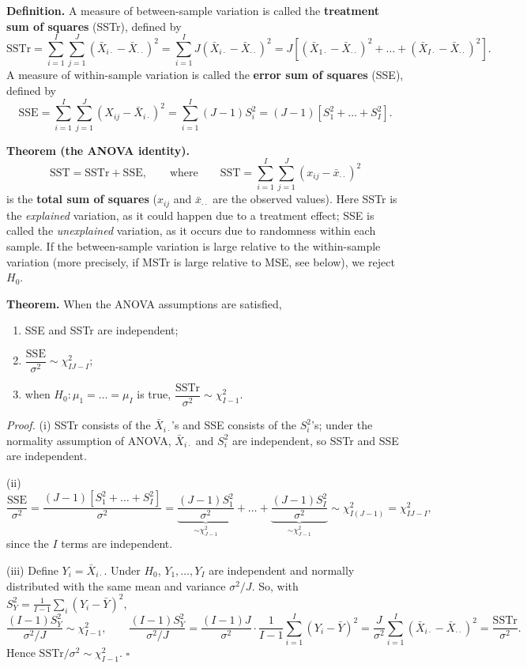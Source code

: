 \textbf{Definition.} A measure of between-sample variation is called the \textbf{treatment sum of squares} (SSTr), defined by
\[
\mathrm{SSTr} = \sum_{i=1}^I\sum_{j=1}^J(\bar{X}_{i\cdot}-\bar{X}_{\cdot\cdot})^2 = \sum_{i=1}^I J(\bar{X}_{i\cdot}-\bar{X}_{\cdot\cdot})^2
= J\left[(\bar{X}_{1\cdot}-\bar{X}_{\cdot\cdot})^2+\dots+(\bar{X}_{I\cdot}-\bar{X}_{\cdot\cdot})^2\right].
\]
A measure of within-sample variation is called the \textbf{error sum of squares} (SSE), defined by
\[
\mathrm{SSE} = \sum_{i=1}^I\sum_{j=1}^J(X_{ij}-\bar{X}_{i\cdot})^2 = \sum_{i=1}^I(J-1)S_i^2 = (J-1)\left[S_1^2+\dots+S_I^2\right].
\]

\textbf{Theorem (the ANOVA identity).}
\[
\mathrm{SST} = \mathrm{SSTr}+\mathrm{SSE},\qquad\text{where}\qquad \mathrm{SST}=\sum_{i=1}^I\sum_{j=1}^J(x_{ij}-\bar{x}_{\cdot\cdot})^2
\]
is the \textbf{total sum of squares} ($x_{ij}$ and $\bar{x}_{\cdot\cdot}$ are the observed values).
Here SSTr is the \emph{explained} variation, as it could happen due to a treatment effect; SSE is called the \emph{unexplained} variation,
as it occurs due to randomness within each sample.
If the between-sample variation is large relative to the within-sample variation (more precisely, if MSTr is large relative to MSE, see below), we reject $H_0$.

\textbf{Theorem.} When the ANOVA assumptions are satisfied,
\begin{enumerate}
  \item[(i)] SSE and SSTr are independent;
  \item[(ii)] $\dfrac{\mathrm{SSE}}{\sigma^2}\sim\chi^2_{IJ-I}$;
  \item[(iii)] when $H_0:\mu_1=\dots=\mu_I$ is true, $\dfrac{\mathrm{SSTr}}{\sigma^2}\sim\chi^2_{I-1}$.
\end{enumerate}

\emph{Proof.}
(i) SSTr consists of the $\bar{X}_{i\cdot}$'s and SSE consists of the $S_i^2$'s; under the normality assumption of ANOVA, $\bar{X}_{i\cdot}$ and $S_i^2$ are independent, so SSTr and SSE are independent.

(ii)
\[
\frac{\mathrm{SSE}}{\sigma^2} = \frac{(J-1)\left[S_1^2+\dots+S_I^2\right]}{\sigma^2}
= \underbrace{\frac{(J-1)S_1^2}{\sigma^2}}_{\sim\chi^2_{J-1}}+\dots+\underbrace{\frac{(J-1)S_I^2}{\sigma^2}}_{\sim\chi^2_{J-1}}
\sim\chi^2_{I(J-1)}=\chi^2_{IJ-I},
\]
since the $I$ terms are independent.

(iii) Define $Y_i=\bar{X}_{i\cdot}$. Under $H_0$, $Y_1,\dots,Y_I$ are independent and normally distributed with the same mean and variance $\sigma^2/J$.
So, with $S_Y^2=\frac{1}{I-1}\sum_i(Y_i-\bar{Y})^2$,
\[
\frac{(I-1)S_Y^2}{\sigma^2/J}\sim\chi^2_{I-1},
\qquad
\frac{(I-1)S_Y^2}{\sigma^2/J} = \frac{(I-1)J}{\sigma^2}\cdot\frac{1}{I-1}\sum_{i=1}^I(Y_i-\bar{Y})^2
= \frac{J}{\sigma^2}\sum_{i=1}^I(\bar{X}_{i\cdot}-\bar{X}_{\cdot\cdot})^2 = \frac{\mathrm{SSTr}}{\sigma^2}.
\]
Hence $\mathrm{SSTr}/\sigma^2\sim\chi^2_{I-1}$. \hfill$\square$

